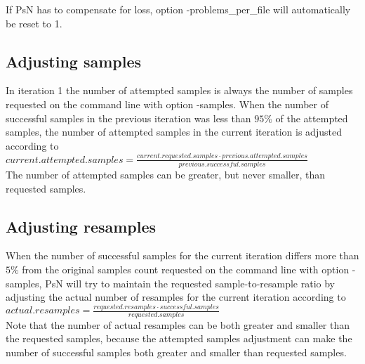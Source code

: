 If PsN has to compensate for loss, option -problems\_per\_file will automatically be reset to 1.
\subsection{Adjusting samples}
In iteration 1 the number of attempted samples is always the number of samples requested on the command line with option -samples. When the number of successful samples in the previous iteration was less than $95\%$ of the attempted samples, the number of attempted samples in the current iteration is adjusted according to\\
$current.attempted.samples=\frac{current.requested.samples \cdot previous.attempted.samples}{previous.successful.samples}$\\
The number of attempted samples can be greater, but never smaller, than requested samples.

\subsection{Adjusting resamples}
When the number of successful samples for the current iteration differs more than $5\%$ from the original samples count requested on the command line with option -samples, PsN will try to maintain the requested sample-to-resample ratio by
adjusting the actual number of resamples for the current iteration according to \\
$actual.resamples=\frac{requested.resamples\cdot successful.samples}{requested.samples}$\\
Note that the number of actual resamples can be both greater and smaller than the requested samples, because the attempted samples adjustment can make the number of successful samples both greater and smaller than requested samples.




